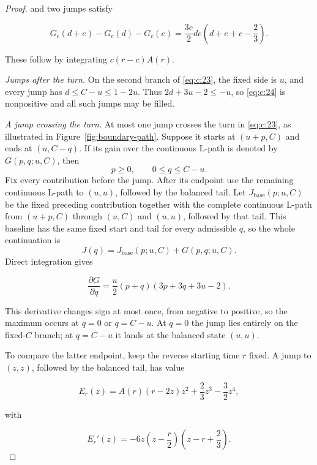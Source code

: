 \begin{proof}
and two jumps satisfy

\begin{equation}
G_c(d+e)-G_c(d)-G_c(e)
=\frac{3c}{2}de\left(d+e+c-\frac23\right).
\label{eq:c:25}
\end{equation}

These follow by integrating \(c(r-c)A(r)\).

\smallskip\noindent\emph{Jumps after the turn.}
On the second branch of \eqref{eq:c:23},
the fixed side is \(u\), and every jump has
\(d\le C-u\le1-2u\). Thus \(2d+3u-2\le-u\), so \eqref{eq:c:24} is nonpositive and all
such jumps may be filled.

\smallskip\noindent\emph{A jump crossing the turn.}
At most one jump crosses the turn in \eqref{eq:c:23}, as illustrated in
Figure~\ref{fig:boundary-path}. Suppose it starts at
\((u+p,C)\) and ends at \((u,C-q)\). If its gain over the continuous L-path
is denoted by \(G(p,q;u,C)\), then
\[
p\ge0,\qquad 0\le q\le C-u.
\]
Fix every contribution before the jump. After its endpoint use the remaining
continuous L-path to \((u,u)\), followed by the balanced tail. Let
\(J_{\mathrm{base}}(p;u,C)\) be the fixed preceding contribution together
with the complete continuous L-path from \((u+p,C)\) through \((u,C)\) and
\((u,u)\), followed by that tail. This baseline has the same fixed start and
tail for every admissible \(q\), so the whole continuation is
\[
J(q)=J_{\mathrm{base}}(p;u,C)+G(p,q;u,C).
\]
Direct integration gives

\begin{equation}
\frac{\partial G}{\partial q}
=\frac u2(p+q)(3p+3q+3u-2).
\label{eq:c:26}
\end{equation}

This derivative changes sign at most once, from negative to positive, so the
maximum occurs at \(q=0\) or \(q=C-u\). At \(q=0\) the jump lies entirely
on the fixed-\(C\) branch; at \(q=C-u\) it lands at the balanced state
\((u,u)\).

To compare the latter endpoint, keep the reverse starting time \(r\) fixed.
A jump to \((z,z)\), followed by the balanced tail, has value

\[
E_r(z)=A(r)(r-2z)z^2+\frac23z^3-\frac32z^4,
\]

with

\begin{equation}
E_r'(z)=-6z\left(z-\frac r2\right)
              \left(z-r+\frac23\right).
\label{eq:c:27}
\end{equation}


\end{proof}
